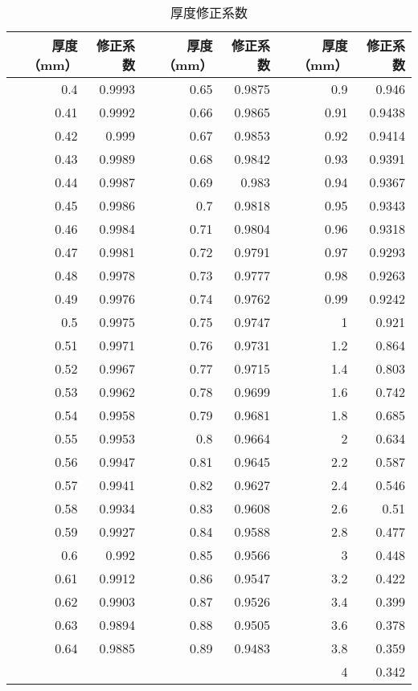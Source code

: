 \documentclass[12pt]{ctexart}
\begin{document}
\begin{table}[h]
	\centering
	\caption{厚度修正系数}
	\label{tab:thickness correction factors}
	\begin{tabular}{|r|r|r|r|r|r|}
	\hline
	\textbf{厚度（mm）} & \textbf{修正系数} & \textbf{厚度（mm）} & \textbf{修正系数} & \textbf{厚度（mm）} & \textbf{修正系数} \\ \hline
	0.4  & 0.9993 & 0.65 & 0.9875 & 0.9  & 0.946  \\ \hline
	0.41 & 0.9992 & 0.66 & 0.9865 & 0.91 & 0.9438 \\ \hline
	0.42 & 0.999  & 0.67 & 0.9853 & 0.92 & 0.9414 \\ \hline
	0.43 & 0.9989 & 0.68 & 0.9842 & 0.93 & 0.9391 \\ \hline
	0.44 & 0.9987 & 0.69 & 0.983  & 0.94 & 0.9367 \\ \hline
	0.45 & 0.9986 & 0.7  & 0.9818 & 0.95 & 0.9343 \\ \hline
	0.46 & 0.9984 & 0.71 & 0.9804 & 0.96 & 0.9318 \\ \hline
	0.47 & 0.9981 & 0.72 & 0.9791 & 0.97 & 0.9293 \\ \hline
	0.48 & 0.9978 & 0.73 & 0.9777 & 0.98 & 0.9263 \\ \hline
	0.49 & 0.9976 & 0.74 & 0.9762 & 0.99 & 0.9242 \\ \hline
	0.5  & 0.9975 & 0.75 & 0.9747 & 1    & 0.921  \\ \hline
	0.51 & 0.9971 & 0.76 & 0.9731 & 1.2  & 0.864  \\ \hline
	0.52 & 0.9967 & 0.77 & 0.9715 & 1.4  & 0.803  \\ \hline
	0.53 & 0.9962 & 0.78 & 0.9699 & 1.6  & 0.742  \\ \hline
	0.54 & 0.9958 & 0.79 & 0.9681 & 1.8  & 0.685  \\ \hline
	0.55 & 0.9953 & 0.8  & 0.9664 & 2    & 0.634  \\ \hline
	0.56 & 0.9947 & 0.81 & 0.9645 & 2.2  & 0.587  \\ \hline
	0.57 & 0.9941 & 0.82 & 0.9627 & 2.4  & 0.546  \\ \hline
	0.58 & 0.9934 & 0.83 & 0.9608 & 2.6  & 0.51   \\ \hline
	0.59 & 0.9927 & 0.84 & 0.9588 & 2.8  & 0.477  \\ \hline
	0.6  & 0.992  & 0.85 & 0.9566 & 3    & 0.448  \\ \hline
	0.61 & 0.9912 & 0.86 & 0.9547 & 3.2  & 0.422  \\ \hline
	0.62 & 0.9903 & 0.87 & 0.9526 & 3.4  & 0.399  \\ \hline
	0.63 & 0.9894 & 0.88 & 0.9505 & 3.6  & 0.378  \\ \hline
	0.64 & 0.9885 & 0.89 & 0.9483 & 3.8  & 0.359  \\ \hline
	     &        &      &        & 4    & 0.342  \\ \hline
	\end{tabular}
\end{table}
\end{document}
